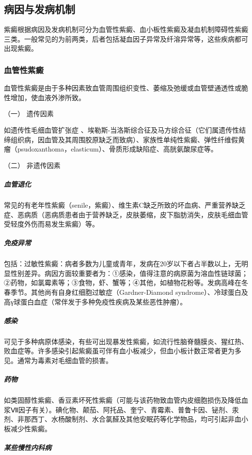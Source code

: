 \subsection{病因与发病机制}

紫癜根据病因及发病机制可分为血管性紫癜、血小板性紫癜及凝血机制障碍性紫癜三类。一般常见的为前两类，后者包括凝血因子异常及纤溶异常等，这些疾病都可出现紫癜。

\subsubsection{血管性紫癜}

血管性紫癜是由于多种因素致血管周围组织变性、萎缩及弛缓或血管壁通透性或脆性增加，使血液外渗所致。

\hypertarget{text00036.htmlux5cux23CHP1-14-1-1-1}{}
（一） 遗传因素

如遗传性毛细血管扩张症
、埃勒斯-当洛斯综合征及马方综合征（它们属遗传性结缔组织病，因血管及其周围胶原缺乏而致病）、家族性单纯性紫癜、弹性纤维假黄瘤（psudoxanthoma，elasticum）、骨质形成缺陷症、高胱氨酸尿症等。

\hypertarget{text00036.htmlux5cux23CHP1-14-1-1-2}{}
（二） 非遗传因素

\subparagraph{血管退化}

常见的有老年性紫癜（senile，紫癜）、维生素C缺乏所致的坏血病、严重营养缺乏症、恶病质（恶病质患者由于营养缺乏，皮肤萎缩，皮下脂肪消失，皮肤毛细血管受轻度外伤而易发生紫癜）等。

\subparagraph{免疫异常}

包括：过敏性紫癜：病者多数为儿童或青年，发病在20岁以下者占半数以上，无明显性别差异。病因方面较重要者为：①感染，值得注意的病原菌为溶血性链球菌；②药物，如氯霉素等；③食物，虾、蟹等；④其他，如植物花粉等。发病高峰在冬春季节。其他尚有自身红细胞过敏症（Gardner-Diamond
syndrome）、冷球蛋白及高γ球蛋白血症（常伴发于多种免疫性疾病及某些恶性肿瘤）。

\subparagraph{感染}

可见于多种病原体感染，有些可出现暴发性紫癜，如流行性脑脊髓膜炎、猩红热、败血症等。许多感染引起紫癜虽可伴有血小板减少，但血小板计数正常者更为多见。通常为毒素对毛细血管的损害。

\subparagraph{药物}

如类固醇性紫癜、香豆素坏死性紫癜（可能与该药物致血管内皮细胞损伤及降低血浆Ⅶ因子有关）。碘化物、颠茄、阿托品、奎宁、青霉素、普鲁卡因、铋剂、汞剂、非那西丁、水杨酸制剂、水合氯醛及其他安眠药等化学物品，均可引起非血小板减少性紫癜。

\subparagraph{某些慢性内科病}

